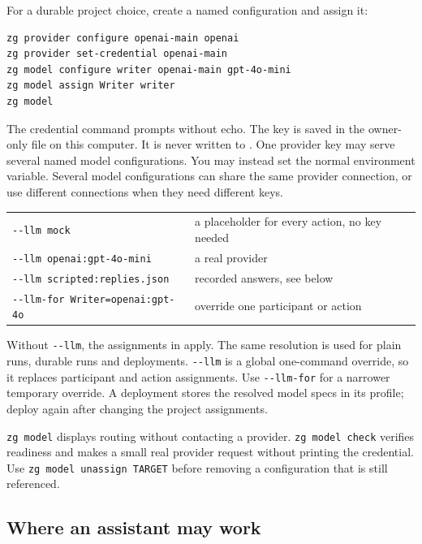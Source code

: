 \documentclass[11pt,a4paper]{article}
\begin{document}
For a durable project choice, create a named configuration and assign it:

\begin{lstlisting}[style=shell]
zg provider configure openai-main openai
zg provider set-credential openai-main
zg model configure writer openai-main gpt-4o-mini
zg model assign Writer writer
zg model
\end{lstlisting}

The credential command prompts without echo. The key is saved in the owner-only
 file on
this computer. It is never written to . One provider key may
serve several named model configurations. You may instead set the normal
environment variable. Several model configurations can share the same
provider connection, or use different connections when they need different
keys.

\begin{center}
\begin{tabularx}{0.95\linewidth}{@{}lX@{}}
\toprule
\texttt{-{}-llm mock} & a placeholder for every action, no key needed \\
\texttt{-{}-llm openai:gpt-4o-mini} & a real provider \\
\texttt{-{}-llm scripted:replies.json} & recorded answers, see below \\
\texttt{-{}-llm-for Writer=openai:gpt-4o} & override one participant or action \\
\bottomrule
\end{tabularx}
\end{center}

Without \texttt{-{}-llm}, the assignments in  apply.
The same resolution is used for plain runs, durable runs and deployments.
\texttt{-{}-llm} is a global one-command override, so it replaces participant
and action assignments. Use \texttt{-{}-llm-for} for a narrower temporary
override. A deployment stores the resolved model specs in its profile; deploy
again after changing the project assignments.

\texttt{zg model} displays routing without contacting a provider.
\texttt{zg model check} verifies readiness and makes a small real provider
request without printing the credential. Use \texttt{zg model unassign TARGET}
before removing a configuration that is still referenced.

\subsection{Where an assistant may work}
\end{document}
